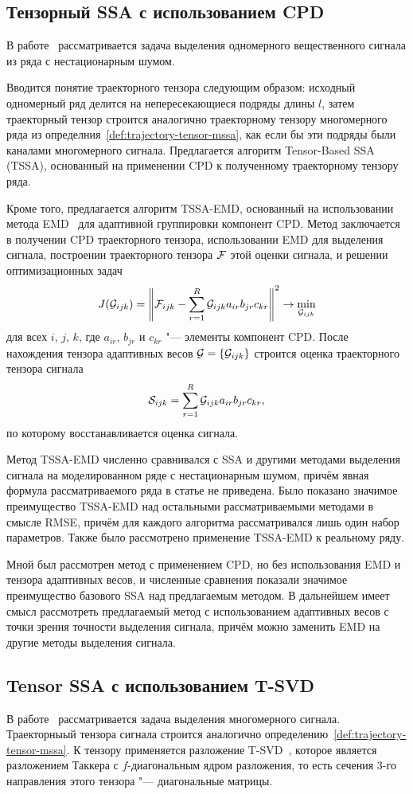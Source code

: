 \documentclass[specialist,
  substylefile=spbu_report.rtx,
subf,href,colorlinks=true, 12pt]{disser}
\theoremstyle{plain}
\theoremstyle{definition}
\theoremstyle{remark}
\begin{document}
\subsection{Тензорный SSA с использованием CPD}
В работе~\cite{TSSA} рассматривается задача выделения одномерного
вещественного сигнала из ряда с нестационарным шумом.

Вводится понятие траекторного тензора следующим образом: исходный
одномерный ряд делится на непересекающиеся подряды длины $l$, затем
траекторный тензор строится аналогично траекторному тензору
многомерного ряда из определния~\ref{def:trajectory-tensor-mssa}, как
если бы эти подряды были каналами многомерного сигнала.
Предлагается алгоритм Tensor-Based SSA (TSSA), основанный на применении CPD
к полученному траекторному тензору ряда.

Кроме того, предлагается алгоритм TSSA-EMD, основанный на
использовании метода EMD~\cite{Lin2005} для адаптивной группировки
компонент CPD.
Метод заключается в получении CPD траекторного тензора, использовании
EMD для выделения сигнала, построении траекторного тензора $\mathcal{F}$
этой оценки сигнала, и решении оптимизационных задач
\[
  J(\mathcal{G}_{ijk}) = \left\|\mathcal{F}_{ijk} - \sum_{r=1}^{R}\mathcal{G}_{ijk} a_{ir} b_{jr}
  c_{kr}\right\|^2 \to \min_{\mathcal{G}_{ijk}}
\]
для всех $i$, $j$, $k$, где $a_{ir}$, $b_{jr}$ и $c_{kr}$ "---
элементы компонент CPD.
После нахождения тензора адаптивных весов $\mathcal{G}=\{\mathcal{G}_{ijk}\}$
строится оценка
траекторного тензора сигнала
\[
  \mathcal{S}_{ijk} = \sum_{r=1}^{R}\mathcal{G}_{ijk} a_{ir} b_{jr} c_{kr},
\]
по которому восстанавливается оценка сигнала.

Метод TSSA-EMD численно сравнивался с SSA и другими методами
выделения сигнала на моделированном ряде с
нестационарным шумом, причём явная
формула рассматриваемого ряда в статье не приведена.
Было показано значимое преимущество TSSA-EMD над остальными
рассматриваемыми методами в смысле RMSE, причём для каждого алгоритма
рассматривался лишь один набор параметров.
Также было рассмотрено применение TSSA-EMD к реальному ряду.

Мной был рассмотрен метод с применением CPD, но без использования EMD
и тензора адаптивных весов, и численные сравнения показали значимое преимущество
базового SSA над предлагаемым методом.
В дальнейшем имеет смысл рассмотреть предлагаемый метод с
использованием адаптивных весов с точки зрения точности выделения
сигнала, причём можно заменить EMD на другие методы выделения сигнала.

\subsection{Tensor SSA с использованием T-SVD}
В работе~\cite{TrungLe2024} рассматривается задача выделения
многомерного сигнала.
Траекторныый тензора сигнала строится аналогично
определению~\ref{def:trajectory-tensor-mssa}.
К тензору применяется разложение T-SVD~\cite{Kilmer2011,Kilmer2013}, которое
является разложением Таккера с $f$-диагональным ядром разложения, то
есть сечения 3-го направления этого тензора "--- диагональные матрицы.
\end{document}
